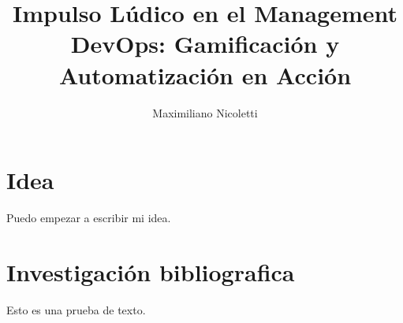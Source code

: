 \documentclass[journal]{IEEEtran}
\begin{document}
\title{Impulso Lúdico en el Management DevOps: Gamificación y Automatización en Acción}

\author{Maximiliano Nicoletti}

\maketitle

\section{Idea}
Puedo empezar a escribir mi idea.

\section{Investigación bibliografica}

\cite{ayoup2022achievement} Esto es una prueba de texto.

\cite[Capítulo XIX - Métricas o Muerte]{estructuraludicadurgan2015}

\cite{zichermann2011gamification}



\end{document}
